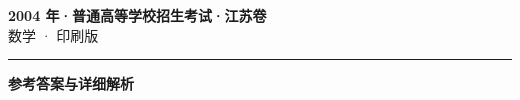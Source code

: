 \documentclass[zihao=5, a4paper]{ctexart}
\begin{document}
\begin{center}
  {\Large\bfseries 2004 年·普通高等学校招生考试·江苏卷}\\[4pt]
  {\large 数学 · 印刷版}
\end{center}
\medskip
{}

\par\bigskip\hrule\bigskip
{}
\begin{center}{\large\bfseries 参考答案与详细解析}\end{center}
\smallskip

\end{document}
